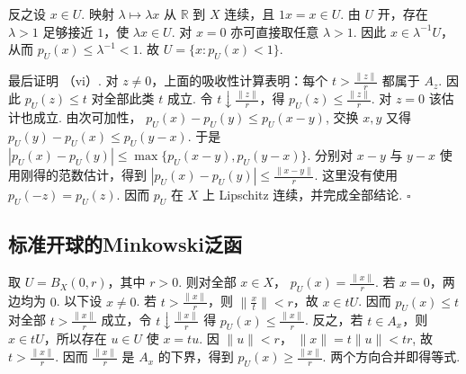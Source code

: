 \begin{FAProof}
反之设 \(\displaystyle x\in U\). 映射 \(\displaystyle \lambda\mapsto\lambda x\) 从 \(\displaystyle \mathbb R\) 到 \(\displaystyle X\) 连续，且 \(\displaystyle1x=x\in U\). 由 \(\displaystyle U\) 开，存在 \(\displaystyle \lambda>1\) 足够接近 \(\displaystyle1\)，使 \(\displaystyle \lambda x\in U\). 对 \(\displaystyle x=0\) 亦可直接取任意 \(\displaystyle \lambda>1\). 因此 \(\displaystyle x\in\lambda^{-1}U\)，
从而 \(\displaystyle p_U(x)\leqslant\lambda^{-1}<1\).
故 \(\displaystyle U=\{x:p_U(x)<1\}\).

最后证明 （vi）. 对 \(\displaystyle z\neq0\)，上面的吸收性计算表明：每个 \(\displaystyle t>\frac{\|z\|}{r}\) 都属于 \(\displaystyle A_z\). 因此 \(\displaystyle p_U(z)\leqslant t\)
对全部此类 \(\displaystyle t\) 成立. 令 \(\displaystyle t\downarrow\frac{\|z\|}{r}\)，得 \(\displaystyle p_U(z)\leqslant\frac{\|z\|}{r}\).
对 \(\displaystyle z=0\) 该估计也成立. 由次可加性， \(\displaystyle p_U(x)-p_U(y)\leqslant p_U(x-y)\),
交换 \(\displaystyle x,y\) 又得 \(\displaystyle p_U(y)-p_U(x)\leqslant p_U(y-x)\).
于是 \(\displaystyle |p_U(x)-p_U(y)| \leqslant \max\{p_U(x-y),p_U(y-x)\}\).
分别对 \(\displaystyle x-y\) 与 \(\displaystyle y-x\) 使用刚得的范数估计，得到 \(\displaystyle |p_U(x)-p_U(y)| \leqslant\frac{\|x-y\|}{r}\).
这里没有使用 \(\displaystyle p_U(-z)=p_U(z)\). 因而 \(\displaystyle p_U\) 在 \(\displaystyle X\) 上 Lipschitz 连续，并完成全部结论.
\hfill\(\square\)
\end{FAProof}

\subsection{标准开球的Minkowski泛函}

\begin{FAExample}[开球的Minkowski泛函]\label{i06:minkowski-ball}
取 \(\displaystyle U=B_X(0,r)\)，其中 \(\displaystyle r>0\). 则对全部 \(\displaystyle x\in X\)， \(\displaystyle p_U(x)=\frac{\|x\|}{r}\).
若 \(\displaystyle x=0\)，两边均为 \(\displaystyle0\). 以下设 \(\displaystyle x\neq0\). 若 \(\displaystyle t>\frac{\|x\|}{r}\)，则 \(\displaystyle \|\frac{x}{t}\|<r\)，故 \(\displaystyle x\in tU\). 因而 \(\displaystyle p_U(x)\leqslant t\) 对全部 \(\displaystyle t>\frac{\|x\|}{r}\) 成立，令 \(\displaystyle t\downarrow\frac{\|x\|}{r}\) 得 \(\displaystyle p_U(x)\leqslant\frac{\|x\|}{r}\).
反之，若 \(\displaystyle t\in A_x\)，则 \(\displaystyle x\in tU\)，所以存在 \(\displaystyle u\in U\) 使 \(\displaystyle x=tu\). 因 \(\displaystyle \|u\|<r\)， \(\displaystyle \|x\|=t\|u\|<tr\),
故 \(\displaystyle t>\frac{\|x\|}{r}\). 因而 \(\displaystyle \frac{\|x\|}{r}\) 是 \(\displaystyle A_x\) 的下界，得到 \(\displaystyle p_U(x)\geqslant\frac{\|x\|}{r}\). 两个方向合并即得等式.
\end{FAExample}

